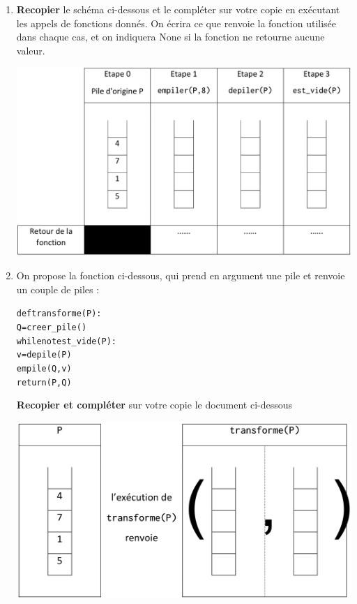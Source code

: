 \documentclass[11pt,a4paper,french,twoside]{PMCours}
\begin{document}
\begin{enumerate} 
    \item \textbf{Recopier} le schéma ci-dessous et le compléter sur votre copie en exécutant
    les appels de fonctions donnés. On écrira ce que renvoie la fonction utilisée
    dans chaque cas, et on indiquera None si la fonction ne retourne aucune
    valeur.
    \begin{center}
        \includegraphics[width=\linewidth]{BacBlanc2Sujet1_NSI2122-img3.png}
    \end{center}
    \item On propose la fonction ci-dessous, qui prend en argument une pile  et renvoie
    un couple de piles :
    \begin{alltt}
    def transforme(P) :
        Q = creer\_pile()
        while not est\_vide(P) :
            v = depile(P)
            empile(Q,v)
        return (P,Q)
    \end{alltt}

\newpage
    \textbf{Recopier et compléter} sur votre copie le document ci-dessous
    \begin{center}
    \includegraphics[width=0.8\linewidth]{BacBlanc2Sujet1_NSI2122-img4.png}
    \end{center}


\end{enumerate}
\end{document}

